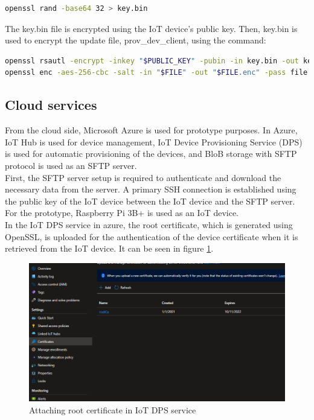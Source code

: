 \documentclass[12pt,a4paper]{article}
\begin{document}
{\begin{lstlisting}[language=bash]
openssl rand -base64 32 > key.bin
\end{lstlisting}

The key.bin file is encrypted using the IoT device's public key. Then, key.bin is used to encrypt the update file, prov\_dev\_client, using the command:

\begin{lstlisting}[language=bash]
openssl rsautl -encrypt -inkey "$PUBLIC_KEY" -pubin -in key.bin -out key.bin.enc
openssl enc -aes-256-cbc -salt -in "$FILE" -out "$FILE.enc" -pass file:key.bin
\end{lstlisting}

\subsection{Cloud services}

From the cloud side, Microsoft Azure is used for prototype purposes. In Azure, IoT Hub is used for device management, IoT Device Provisioning Service (DPS) is used for automatic provisioning of the devices, and BloB storage with SFTP protocol is used as an SFTP server. \\

First, the SFTP server setup is required to authenticate and download the necessary data from the server. A primary SSH connection is established using the public key of the IoT device between the IoT device and the SFTP server. For the prototype, Raspberry Pi 3B+ is used as an IoT device. \\

In the IoT DPS service in azure, the root certificate, which is generated using OpenSSL, is uploaded for the authentication of the device certificate when it is retrieved from the IoT device. It can be seen in figure \ref{attach_root_cert}.

\begin{figure}[h]
\centering
\includegraphics[scale=0.65]{root_cert_dps.png}
\caption{Attaching root certificate in IoT DPS service}
\label{attach_root_cert}
\end{figure}

}
\end{document}
